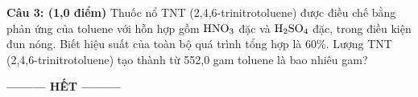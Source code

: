 \documentclass[11pt,a4paper]{article}
\begin{document}
\vspace{2pt}
\noindent
{}

\vspace{4pt}
\noindent
\textbf{Câu 3: (1,0 điểm)} Thuốc nổ TNT (2,4,6-trinitrotoluene) được điều chế bằng phản ứng của toluene với hỗn hợp gồm $\ce{HNO3}$ đặc và $\ce{H2SO4}$ đặc, trong điều kiện đun nóng. Biết hiệu suất của toàn bộ quá trình tổng hợp là 60\%. Lượng TNT (2,4,6-trinitrotoluene) tạo thành từ 552,0 gam toluene là bao nhiêu gam?

\vspace{2pt}
\noindent
{}

\vspace{8pt}
\begin{center}
\textbf{--------- HẾT ---------}
\end{center}
\end{document}
